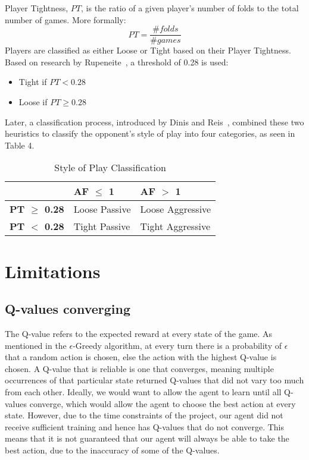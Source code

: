 \documentclass{article}
\begin{document}
Player Tightness, $PT$, is the ratio of a given player's number of folds to the total number of games. More formally:
\begin{displaymath}
  PT =  \frac{\text{\# }folds}{\text{\# }games} 
\end{displaymath}
\noindent Players are classified as either Loose or Tight based on their Player Tightness. Based on research by Rupeneite~, a threshold of 0.28 is used:
\begin{itemize}
	\item Tight if $PT < 0.28$
	\item Loose if $PT \geq 0.28$
\end{itemize}

Later, a classification process, introduced by Dinis and Reis~, combined these two heuristics to classify the opponent's style of play into four categories, as seen in Table 4.

\begin{table}[h!]
  \begin{center}
    \begin{tabular}{p{1.5cm}|p{2cm}|p{2cm}}
      \textbf{} & \textbf{AF $\leq$ 1} & \textbf{AF $>$ 1} \\
      \hline
      \textbf{PT $\geq$ 0.28} & Loose \newline Passive & Loose \newline Aggressive \\
      \hline
      \textbf{PT $<$ 0.28} & Tight \newline Passive & Tight \newline Aggressive \\
    \end{tabular}
    \caption{Style of Play Classification}
    \label{tab:table4}
  \end{center}
\end{table}

\section{Limitations}

\subsection{Q-values converging}

The Q-value refers to the expected reward at every state of the game. As mentioned in the $\epsilon$-Greedy algorithm, at every turn there is a probability of $\epsilon$ that a random action is chosen, else the action with the highest Q-value is chosen. A Q-value that is reliable is one that converges, meaning multiple occurrences of that particular state returned Q-values that did not vary too much from each other. Ideally, we would want to allow the agent to learn until all Q-values converge, which would allow the agent to choose the best action at every state. However, due to the time constraints of the project, our agent did not receive sufficient training and hence has Q-values that do not converge. This means that it is not guaranteed that our agent will always be able to take the best action, due to the inaccuracy of some of the Q-values.
\end{document}
